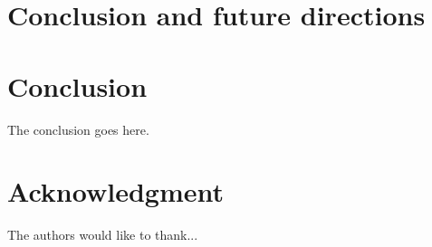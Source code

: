 \documentclass[conference]{IEEEtran}
\begin{document}

\section{Conclusion and future directions}
\label{sec:ccl}




\section{Conclusion}
The conclusion goes here.






\section*{Acknowledgment}


The authors would like to thank...




\end{document}
